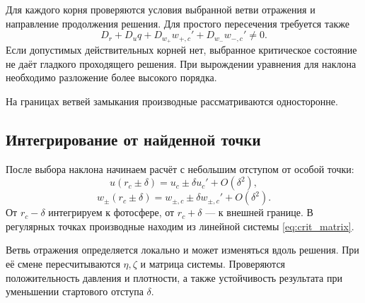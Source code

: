 \documentclass[12pt,a4paper]{article}
\begin{document}
Для каждого корня проверяются условия выбранной
ветви отражения и направление продолжения решения.
Для простого пересечения требуется также
\[
D_r+D_uq+D_{w_+}w_{+,c}'+D_{w_-}w_{-,c}'\ne0.
\]
Если допустимых действительных корней нет,
выбранное критическое состояние не даёт
гладкого проходящего решения.
При вырождении уравнения для наклона необходимо
разложение более высокого порядка.

На границах ветвей замыкания производные
рассматриваются односторонне.

\subsection{Интегрирование от найденной точки}

После выбора наклона начинаем расчёт
с небольшим отступом от особой точки:
\[
u(r_c\pm\delta)=u_c\pm\delta u_c'+O(\delta^2),
\]
\[
w_\pm(r_c\pm\delta)
=w_{\pm,c}\pm\delta w_{\pm,c}'+O(\delta^2).
\]
От $r_c-\delta$ интегрируем к фотосфере,
от $r_c+\delta$ --- к внешней границе.
В регулярных точках производные находим
из линейной системы \eqref{eq:crit_matrix}.

Ветвь отражения определяется локально
и может изменяться вдоль решения.
При её смене пересчитываются $\eta,\zeta$
и матрица системы.
Проверяются положительность давления и плотности,
а также устойчивость результата при уменьшении
стартового отступа $\delta$.
\end{document}
